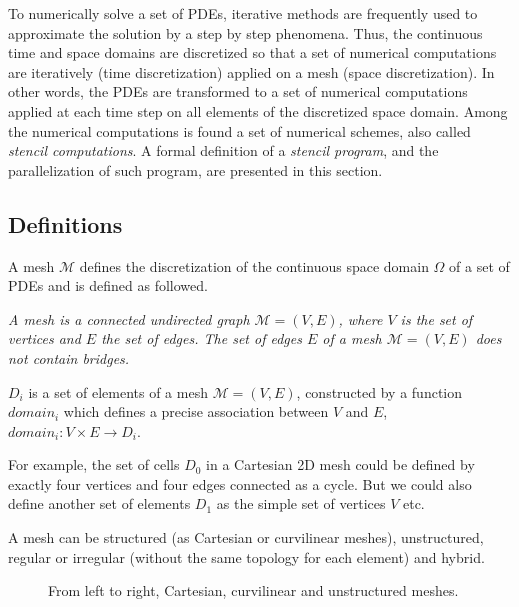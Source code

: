To numerically solve a set of PDEs, iterative methods are frequently used to approximate the solution by a step by step phenomena. Thus, the continuous time and space domains are discretized so that a set of numerical computations are iteratively (time discretization) applied on a mesh (space discretization). In other words, the PDEs are transformed to a set of numerical computations applied at each time step on all elements of the discretized space domain. Among the numerical computations is found a set of numerical schemes, also called \textit{stencil computations}.
A formal definition of a \textit{stencil program}, and the parallelization of such program, are presented in this section.

\subsection{Definitions}

A mesh $\mathcal{M}$ defines the discretization of the continuous space domain $\Omega$ of a set of PDEs and is defined as followed. 

\begin{mydef}
\textit{A mesh is a connected undirected graph $\mathcal{M}=(V,E)$, where $V$ is the set of vertices and $E$ the set of edges. The set of edges $E$ of a mesh $\mathcal{M}=(V,E)$ does not contain bridges.}
\end{mydef}

\begin{mydef}
$D_i$ is a set of elements of a mesh $\mathcal{M}=(V,E)$, constructed by a function $domain_i$ which defines a precise association between $V$ and $E$, $domain_i : V \times E \rightarrow D_i$.
\end{mydef}
For example, the set of cells $D_0$ in a Cartesian 2D mesh could be defined by exactly four vertices and four edges connected as a cycle. But we could also define another set of elements $D_1$ as the simple set of vertices $V$ etc.

A mesh can be structured (as Cartesian or curvilinear meshes), unstructured, regular or irregular (without the same topology for each element) and hybrid. 

\begin{figure}[!h]\begin{center}
  \caption{From left to right, Cartesian, curvilinear and unstructured meshes.}
  \label{fig:mesh}
\end{center}\end{figure}


